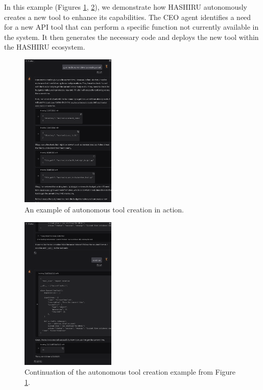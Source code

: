 \documentclass[conference]{IEEEtran}
\begin{document}
In this example (Figures \ref{fig:autonomous_tool_creation}, \ref{fig:autonomous_tool_creation2}), we demonstrate how HASHIRU autonomously creates a new tool to enhance its capabilities. The CEO agent identifies a need for a new API tool that can perform a specific function not currently available in the system. It then generates the necessary code and deploys the new tool within the HASHIRU ecosystem.

\begin{figure}
    
    \centering
    \includegraphics[width=0.4\textwidth]{tool1.png}
    \caption{An example of autonomous tool creation in action.}
    \label{fig:autonomous_tool_creation}
\end{figure}

\begin{figure}
    \centering
    \includegraphics[width=0.4\textwidth]{tool2.png}
    \caption{Continuation of the autonomous tool creation example from Figure \ref{fig:autonomous_tool_creation}.}
    \label{fig:autonomous_tool_creation2}
\end{figure}
    
\end{document}

